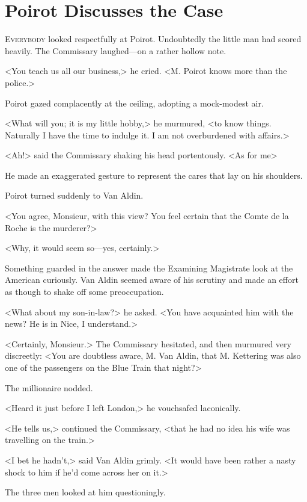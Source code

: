 \chapter{Poirot Discusses the Case}



\lettrine{E}{verybody} looked respectfully at Poirot. Undoubtedly the little man had scored heavily. The Commissary laughed—on a rather hollow note.

\zz
<You teach us all our business,> he cried. <M. Poirot knows more than the police.>

Poirot gazed complacently at the ceiling, adopting a mock-modest air.

<What will you; it is my little hobby,> he murmured, <to know things. Naturally I have the time to indulge it. I am not overburdened with affairs.>

<Ah!> said the Commissary shaking his head portentously. <As for me\longdash>

He made an exaggerated gesture to represent the cares that lay on his shoulders.

Poirot turned suddenly to Van Aldin.

<You agree, Monsieur, with this view? You feel certain that the Comte de la Roche is the murderer?>

<Why, it would seem so—yes, certainly.>

Something guarded in the answer made the Examining Magistrate look at the American curiously. Van Aldin seemed aware of his scrutiny and made an effort as though to shake off some preoccupation.

<What about my son-in-law?> he asked. <You have acquainted him with the news? He is in Nice, I understand.>

<Certainly, Monsieur.> The Commissary hesitated, and then murmured very discreetly: <You are doubtless aware, M. Van Aldin, that M. Kettering was also one of the passengers on the Blue Train that night?>

The millionaire nodded.

<Heard it just before I left London,> he vouchsafed laconically.

<He tells us,> continued the Commissary, <that he had no idea his wife was travelling on the train.>

<I bet he hadn't,> said Van Aldin grimly. <It would have been rather a nasty shock to him if he'd come across her on it.>

The three men looked at him questioningly.

